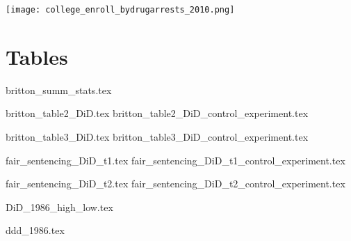 \documentclass{article}
\begin{document}
\texttt{[image: college\_enroll\_bydrugarrests\_2010.png]}


\section*{Tables}
{britton_summ_stats.tex}

{britton_table2_DiD.tex}
{britton_table2_DiD_control_experiment.tex}

{britton_table3_DiD.tex}
{britton_table3_DiD_control_experiment.tex}

{fair_sentencing_DiD_t1.tex}
{fair_sentencing_DiD_t1_control_experiment.tex}

{fair_sentencing_DiD_t2.tex}
{fair_sentencing_DiD_t2_control_experiment.tex}

{DiD_1986_high_low.tex}

{ddd_1986.tex}



\clearpage
\nocite{*}
\singlespacing




\clearpage
\end{document}
